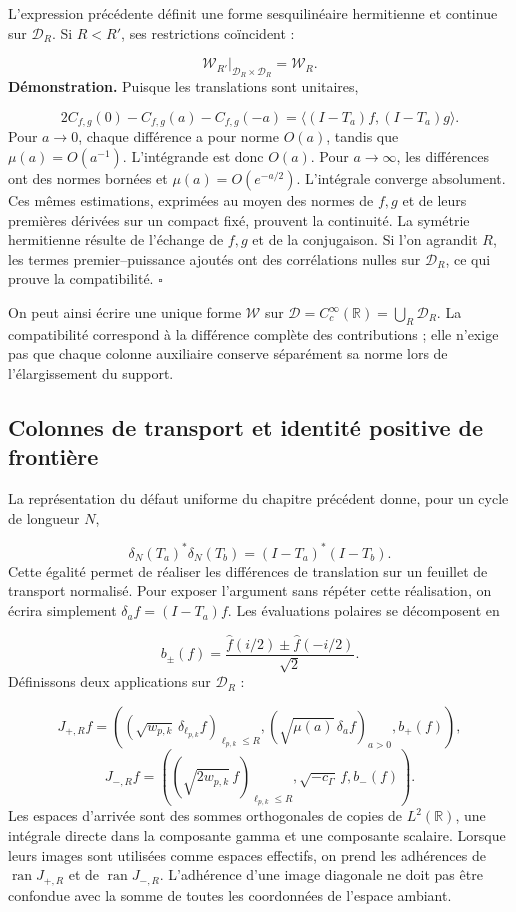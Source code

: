 L'expression précédente définit une forme sesquilinéaire hermitienne et continue sur \(\mathcal D_R\). Si \(R<R'\), ses restrictions coïncident :

\[
\mathscr W_{R'}|_{\mathcal D_R\times\mathcal D_R}=\mathscr W_R.
\]
\textbf{Démonstration.} Puisque les translations sont unitaires,

\[
2C_{f,g}(0)-C_{f,g}(a)-C_{f,g}(-a)
=\langle(I-T_a)f,(I-T_a)g\rangle.
\]
Pour \(a\to0\), chaque différence a pour norme \(O(a)\), tandis que \(\mu(a)=O(a^{-1})\). L’intégrande est donc \(O(a)\). Pour \(a\to\infty\), les différences ont des normes bornées et \(\mu(a)=O(e^{-a/2})\). L’intégrale converge absolument. Ces mêmes estimations, exprimées au moyen des normes de \(f,g\) et de leurs premières dérivées sur un compact fixé, prouvent la continuité. La symétrie hermitienne résulte de l’échange de \(f,g\) et de la conjugaison. Si l’on agrandit \(R\), les termes premier–puissance ajoutés ont des corrélations nulles sur \(\mathcal D_R\), ce qui prouve la compatibilité. \hfill\(\square\)

On peut ainsi écrire une unique forme \(\mathscr W\) sur \(\mathcal D=C_c^\infty(\mathbb R)=\bigcup_R\mathcal D_R\). La compatibilité correspond à la différence complète des contributions ; elle n'exige pas que chaque colonne auxiliaire conserve séparément sa norme lors de l'élargissement du support.

\subsection{Colonnes de transport et identité positive de frontière}
\label{rz:columnas}
La représentation du défaut uniforme du chapitre précédent donne, pour un cycle de longueur \(N\),

\[
\delta_N(T_a)^*\delta_N(T_b)=(I-T_a)^*(I-T_b).
\]
Cette égalité permet de réaliser les différences de translation sur un feuillet de transport normalisé. Pour exposer l'argument sans répéter cette réalisation, on écrira simplement \(\delta_af=(I-T_a)f\). Les évaluations polaires se décomposent en

\[
b_\pm(f)=\frac{\widehat f(i/2)\pm\widehat f(-i/2)}{\sqrt2}.
\]
Définissons deux applications sur \(\mathcal D_R\) :

\[
J_{+,R}f=
\left(
(\sqrt{w_{p,k}}\,\delta_{\ell_{p,k}}f)_{\ell_{p,k}\leq R},
(\sqrt{\mu(a)}\,\delta_af)_{a>0},
b_+(f)
\right),
\]
\[
J_{-,R}f=
\left(
(\sqrt{2w_{p,k}}\,f)_{\ell_{p,k}\leq R},
\sqrt{-c_\Gamma}\,f,
b_-(f)
\right).
\]
Les espaces d'arrivée sont des sommes orthogonales de copies de \(L^2(\mathbb R)\), une intégrale directe dans la composante gamma et une composante scalaire. Lorsque leurs images sont utilisées comme espaces effectifs, on prend les adhérences de \(\operatorname{ran}J_{+,R}\) et de \(\operatorname{ran}J_{-,R}\). L'adhérence d'une image diagonale ne doit pas être confondue avec la somme de toutes les coordonnées de l'espace ambiant.

